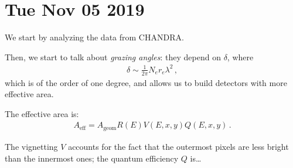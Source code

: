 \documentclass[main.tex]{subfiles}
\begin{document}
\section*{Tue Nov 05 2019}

We start by analyzing the data from CHANDRA. 

Then, we start to talk about \emph{grazing angles}:
they depend on \(\delta \), where 
%
\begin{align}
  \delta \sim \frac{1}{2 \pi } N_e r_e \lambda^2
\,,
\end{align}
%
which is of the order of one degree, and allows us to
build detectors with more effective area.

The effective area is: 
%
\begin{align}
  A _{\text{eff}} = A _{\text{geom}} R(E) V(E, x, y) Q(E, x, y)
\,.
\end{align}
%

The vignetting \(V\) accounts for the fact that the outermost pixels are less bright than the innermost ones; 
the quantum efficiency \(Q\) is\dots
\end{document}
